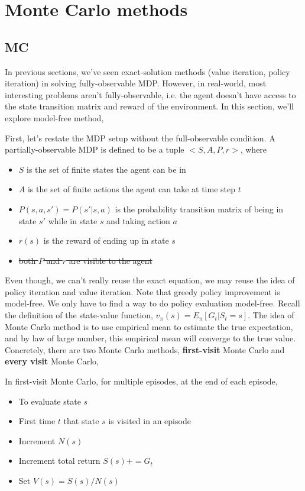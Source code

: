 \documentclass[graybox]{svmult}
\begin{document}
\section{Monte Carlo methods}

\subsection{MC}

In previous sections, we've seen exact-solution methods (value iteration, policy iteration) in solving fully-observable MDP. However, in real-world, most interesting problems aren't fully-observable, i.e. the agent doesn't have access to the state transition matrix and reward of the environment. In this section, we'll explore model-free method,

First, let's restate the MDP setup without the full-observable condition. A partially-observable MDP is defined to be a tuple $<S, A, P, r>$, where
\begin{itemize}
\item $S$ is the set of finite states the agent can be in
\item $A$ is the set of finite actions the agent can take at time step $t$
\item $P(s, a, s') = P(s' | s,  a)$ is the probability transition matrix of being in state $s'$ while in state $s$ and taking action $a$
\item $r(s)$ is the reward of ending up in state $s$ 
\item \st{both $P$ and $r$ are visible to the agent}
\end{itemize}

Even though, we can't really reuse the exact equation, we may reuse the idea of policy iteration and value iteration. Note that greedy policy improvement is model-free. We only have to find a way to do policy evaluation model-free. Recall the definition of the state-value function,  $v_{\pi}(s) = E_{\pi}[G_t | S_t = s]$. The idea of Monte Carlo method is to use empirical mean to estimate the true expectation, and by law of large number, this empirical mean will converge to the true value. Concretely, there are two Monte Carlo methods, \textbf{first-visit} Monte Carlo and \textbf{every visit} Monte Carlo,

In first-visit Monte Carlo, for multiple episodes, at the end of each episode,
\begin{itemize}
\item To evaluate state $s$
\item First time $t$ that state $s$ is visited in an episode
\item Increment $N(s)$
\item Increment total return $S(s) += G_t$
\item Set $V(s) = S(s) / N(s)$
\end{itemize}
\end{document}
